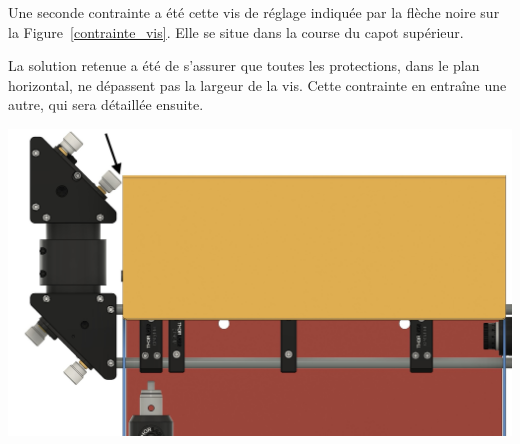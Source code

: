 \begin{minipage}[c]{0.4\textwidth}
    Une seconde contrainte a été cette vis de réglage indiquée par la flèche noire sur la Figure~\ref{contrainte_vis}. Elle se situe dans la course du capot supérieur.

    La solution retenue a été de s'assurer que toutes les protections, dans le plan horizontal, ne dépassent pas la largeur de la vis. Cette contrainte en entraîne une autre, qui sera détaillée ensuite.
\end{minipage}\hfill
\begin{minipage}[c]{0.58\textwidth}
    \begin{center}
        \includegraphics[width=\textwidth]{assets/figures/Protections_laser/Securite_mecanique/Protection_entree_laser/contrainte_vis.jpeg}
    \end{center}
    \label{contrainte_vis}
\end{minipage}

